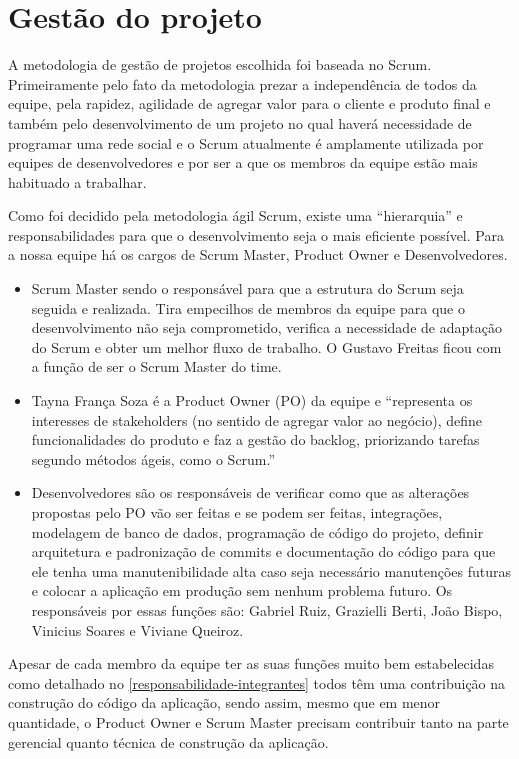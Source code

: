 \chapter{Gestão do projeto}

A metodologia de gestão de projetos escolhida foi baseada no Scrum. Primeiramente pelo fato da metodologia prezar a independência de todos da equipe, pela rapidez, agilidade de agregar valor para o cliente e produto final e também pelo desenvolvimento de um projeto no qual haverá necessidade de programar uma rede social e o Scrum atualmente é amplamente utilizada por equipes de desenvolvedores e por ser a que os membros da equipe estão mais habituado a trabalhar.

Como foi decidido pela metodologia ágil Scrum, existe uma “hierarquia” e responsabilidades para que o desenvolvimento seja o mais eficiente possível. Para a nossa equipe há os cargos de Scrum Master, Product Owner e Desenvolvedores.

\begin{itemize}
	\item Scrum Master sendo o responsável para que a estrutura do Scrum seja seguida e realizada. Tira empecilhos de membros da equipe para que o desenvolvimento não seja comprometido, verifica a necessidade de adaptação do Scrum e obter um melhor fluxo de trabalho. O Gustavo Freitas ficou com a função de ser o Scrum Master do time.
	
	\item Tayna França Soza é a Product Owner (PO) da equipe e “representa os interesses de stakeholders (no sentido de agregar valor ao negócio), define funcionalidades do produto e faz a gestão do backlog, priorizando tarefas segundo métodos ágeis, como o Scrum.” \cite{especificações_do_PO}
	
	\item Desenvolvedores são os responsáveis de verificar como que as alterações propostas pelo PO vão ser feitas e se podem ser feitas, integrações, modelagem de banco de dados, programação de código do projeto, definir arquitetura e padronização de commits e documentação do código para que ele tenha uma manutenibilidade alta caso seja necessário manutenções futuras e colocar a aplicação em produção sem nenhum problema futuro. Os responsáveis por essas funções são: Gabriel Ruiz, Grazielli Berti, João Bispo, Vinicius Soares e Viviane Queiroz.
	
\end{itemize}

Apesar de cada membro da equipe ter as suas funções muito bem estabelecidas como detalhado no \autoref{responsabilidade-integrantes} todos têm uma contribuição na construção do código da aplicação, sendo assim, mesmo que em menor quantidade, o Product Owner e Scrum Master precisam contribuir tanto na parte gerencial quanto técnica de construção da aplicação. 

